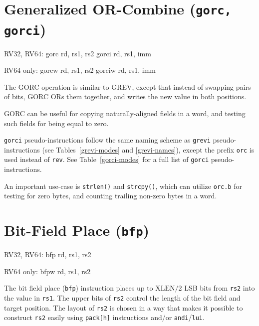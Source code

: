 \section{Generalized OR-Combine (\texttt{gorc, gorci})}

\begin{rvb}
  RV32, RV64:
    gorc  rd, rs1, rs2
    gorci rd, rs1, imm

  RV64 only:
    gorcw  rd, rs1, rs2
    gorciw rd, rs1, imm
\end{rvb}

The GORC operation is similar to GREV, except that instead of swapping pairs of bits,
GORC ORs them together, and writes the new value in both positions.



GORC can be useful for copying naturally-aligned fields in a word, and testing such
fields for being equal to zero.

{\tt gorci} pseudo-instructions follow the same naming scheme as {\tt grevi}
pseudo-instructions (see Tables~\ref{grevi-modes} and \ref{grevi-names}),
except the prefix {\tt orc} is used instead of {\tt rev}. See
Table~\ref{gorci-modes} for a full list of {\tt gorci} pseudo-instructions.

An important use-case is {\tt strlen()} and {\tt strcpy()}, which can utilize
{\tt orc.b} for testing for zero bytes, and counting trailing non-zero bytes
in a word.


\section{Bit-Field Place (\texttt{bfp})}

\begin{rvb}
  RV32, RV64:
    bfp rd, rs1, rs2

  RV64 only:
    bfpw rd, rs1, rs2
\end{rvb}

The bit field place ({\tt bfp}) instruction places up to $\mathrm{XLEN}/2$ LSB bits from {\tt rs2} into
the value in {\tt rs1}. The upper bits of {\tt rs2} control the length of the bit field
and target position. The layout of {\tt rs2} is chosen in a way that makes it possible to construct
{\tt rs2} easily using {\tt pack[h]} instructions and/or {\tt andi}/{\tt lui}.



